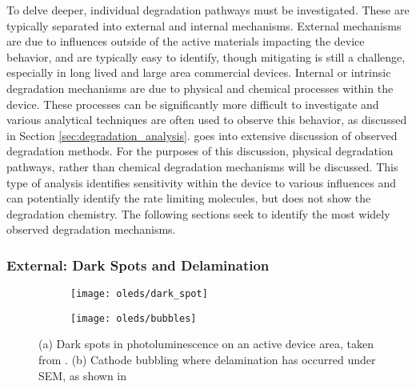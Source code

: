 \documentclass[../thesis.tex]{subfiles}
\begin{document}
To delve deeper, individual degradation pathways must be investigated.
These are typically separated into external and internal mechanisms.\supercite{Scholz2015}
External mechanisms are due to influences outside of the active materials impacting the device behavior, and are typically easy to identify, though mitigating is still a challenge, especially in long lived and large area commercial devices.\supercite{Giebink2017a}
Internal or intrinsic degradation mechanisms are due to physical and chemical processes within the device.
These processes can be significantly more difficult to investigate and various analytical techniques are often used to observe this behavior, as discussed in Section \ref{sec:degradation_analysis}.
\textcite{Scholz2015} goes into extensive discussion of observed degradation methods.
For the purposes of this discussion, physical degradation pathways, rather than chemical degradation mechanisms will be discussed. 
This type of analysis identifies sensitivity within the device to various influences and can potentially identify the rate limiting molecules, but does not show the degradation chemistry.
The following sections seek to identify the most widely observed degradation mechanisms.




\subsubsection{External: Dark Spots and Delamination}

\begin{figure}[ht]
    \centering
    \begin{subfigure}{.4\textwidth}
    \texttt{[image: oleds/dark\_spot]}
    \caption{}
    \label{fig:oleds_dark_spot}\par\vfill
    \end{subfigure}
    \begin{subfigure}{.4\textwidth}
    \texttt{[image: oleds/bubbles]}
    \caption{}
    \label{fig:oleds_bubbles}
    \end{subfigure}
\caption{(a) Dark spots in photoluminescence on an active device area, taken from \textcite{Kolosov2001}. (b) Cathode bubbling where delamination has occurred under SEM, as shown in \textcite{Wang2002a}}
\end{figure}
\end{document}
